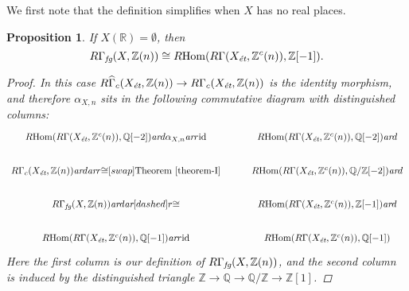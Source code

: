 \documentclass[leqno,12pt]{article}
\theoremstyle{plain}
\newtheorem{proposition}[theorem]{\indent\sc Proposition}
\theoremstyle{definition}
\DeclareMathOperator{\Hom}{Hom}
\newcommand{\QQ}{\mathbb{Q}}
\newcommand{\RR}{\mathbb{R}}
\newcommand{\ZZ}{\mathbb{Z}}
\newcommand{\ar}{\text{\it ar}}
\newcommand{\et}{\text{\it \'{e}t}}
\newcommand{\fg}{\text{\it fg}}
\newcommand{\RHom}{R\!\Hom}
\begin{document}
We first note that the definition simplifies when $X$ has no real places.

\begin{proposition}
  \label{prop:RGamma-fg-for-X(R)-empty}
  If $X (\RR) = \emptyset$, then
  \[ R\Gamma_\fg (X, \ZZ (n)) \cong
  \RHom (R\Gamma (X_\et, \ZZ^c (n)), \ZZ [-1]). \]

  \begin{proof}
    In this case
    $R\widehat{\Gamma}_c (X_\et, \ZZ (n)) \to R\Gamma_c (X_\et, \ZZ (n))$
    is the identity morphism, and therefore $\alpha_{X,n}$ sits in the following
    commutative diagram with distinguished columns:
    \[ \begin{tikzcd}
      \RHom (R\Gamma (X_\et, \ZZ^c (n)), \QQ [-2])\ar{d}{\alpha_{X,n}} \ar{r}{\mathrm{id}} & \RHom (R\Gamma (X_\et, \ZZ^c (n)), \QQ [-2])\ar{d} \\
      R\Gamma_c (X_\et, \ZZ (n))\ar{d} \ar{r}{\cong}[swap]{\text{Theorem~\ref{theorem-I}}} & \RHom (R\Gamma (X_\et, \ZZ^c (n)), \QQ/\ZZ [-2])\ar{d} \\
      R\Gamma_\fg (X, \ZZ (n))\ar{d} \ar[dashed]{r}{\cong} & \RHom (R\Gamma (X_\et, \ZZ^c (n)), \ZZ [-1])\ar{d} \\
      \RHom (R\Gamma (X_\et, \ZZ^c (n)), \QQ [-1]) \ar{r}{\mathrm{id}} & \RHom (R\Gamma (X_\et, \ZZ^c (n)), \QQ [-1])
    \end{tikzcd} \]
    Here the first column is our definition of $R\Gamma_\fg (X, \ZZ (n))$,
    and the second column is induced by the distinguished triangle
    $\ZZ \to \QQ \to \QQ/\ZZ \to \ZZ [1]$.
  \end{proof}
\end{proposition}
\end{document}

